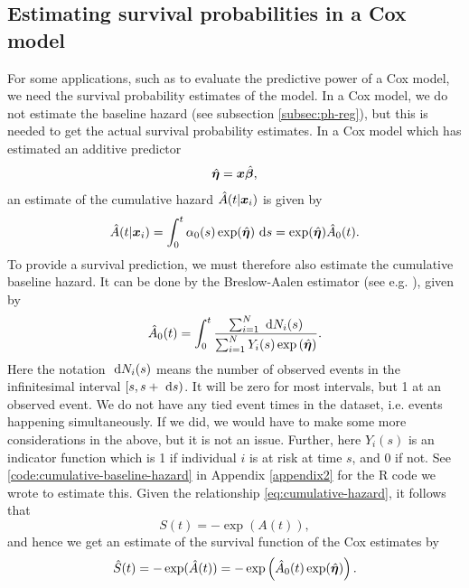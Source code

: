 \subsection{Estimating survival probabilities in a Cox model}
\label{subsec:cox-surv-prob}
For some applications, such as to evaluate the predictive power of a Cox model, we need the survival probability estimates of the model.
In a Cox model, we do not estimate the baseline hazard (see subsection \ref{subsec:ph-reg}), but this is needed to get the actual survival probability estimates.
In a Cox model which has estimated an additive predictor
\begin{equation}
    \hat{\boldsymbol{\eta}}=\bm{x}\hat{\boldsymbol{\beta}},
\end{equation}
an estimate of the cumulative hazard $\hat{A}(t|\bm{x}_i)$ is given by
\begin{equation*}
    \hat{A}(t|\bm{x}_i)=\int_{0}^t \alpha_0(s)\exp(\hat{\boldsymbol{\eta}})~\text{d} s=\exp(\hat{\boldsymbol{\eta}})\hat{A}_0(t).
\end{equation*}
To provide a survival prediction, we must therefore also estimate the cumulative baseline hazard.
It can be done by the Breslow-Aalen estimator (see e.g. \citet{ABG}), given by
\begin{equation}
    \hat{A}_0(t)=\int_{0}^t\frac{\sum_{i=1}^N ~\text{d} N_i(s)}{\sum_{i=1}^N Y_i(s)\exp \left(\hat{\boldsymbol{\eta}} \right)}.
\end{equation}
Here the notation $~\text{d} N_i(s)$ means the number of observed events in the infinitesimal interval $[s,s+~\text{d} s)$.
It will be zero for most intervals, but 1 at an observed event.
We do not have any tied event times in the dataset, i.e. events happening simultaneously.
If we did, we would have to make some more considerations in the above, but it is not an issue.
Further, here $Y_i(s)$ is an indicator function which is 1 if individual $i$ is at risk at time $s$, and 0 if not. 
See \ref{code:cumulative-baseline-hazard} in Appendix \ref{appendix2} for the R code we wrote to estimate this.
Given the relationship \eqref{eq:cumulative-hazard}, it follows that
\begin{equation*}
    S(t)=-\exp(A(t)),
\end{equation*}
and hence we get an estimate of the survival function of the Cox estimates by
\begin{equation*}
    \hat{S}(t)=-\exp(\hat{A}(t))=-\exp\left(\hat{A}_0(t)\exp(\hat{\boldsymbol{\eta}})\right).
\end{equation*}



